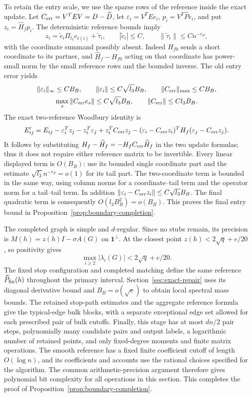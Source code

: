 To retain the entry scale, we use the sparse rows of the reference
inside the exact update.
Let $C_{\rm err}=V^TEV=D-\widehat D$, let
$\varepsilon_i=V^TEe_i$, $p_i=V^T\widehat Pe_i$, and put
$z_i=\widehat H_fp_i$.
The deterministic reference bounds imply
\[
 z_i=\widetilde c_i\Pi_{l_3}e_{t(i)}+\widetilde\tau_i,
 \qquad |\widetilde c_i|\le C,\qquad
 \|\widetilde\tau_i\|\le Cn^{-r_P},
\]
with the coordinate summand possibly absent.  Indeed
$H_{f0}$ sends a short coordinate to its partner, and
$\widehat H_f-H_{f0}$ acting on that coordinate has power-small
norm by the small reference rows and the bounded inverse.
The old entry error yields
\[
 \begin{gathered}
 \|\varepsilon_i\|_\infty\le CB_B,\qquad \|\varepsilon_i\|\le C\sqrt{l_3}B_B,\qquad
 \|C_{\rm err}\|_{\max}\le CB_B,\\
 \max_s\|C_{\rm err}e_s\|\le C\sqrt{l_3}B_B,\qquad
 \|C_{\rm err}\|\le Cl_3B_B.
 \end{gathered}
\]
The exact two-reference Woodbury identity is
\[
 E'_{ij}=E_{ij}-\varepsilon_i^Tz_j-z_i^T\varepsilon_j+z_i^TC_{\rm err}z_j
          -(\varepsilon_i-C_{\rm err}z_i)^TH_f(\varepsilon_j-C_{\rm err}z_j).
\]
It follows by substituting
$H_f-\widehat H_f=-H_fC_{\rm err}\widehat H_f$ in the two update
formulas; thus it does not require either reference matrix to be
invertible.
Every linear displayed term is $O(B_B)$: use its bounded single
coordinate part and the estimate
$\sqrt{l_3}n^{-r_P}=o(1)$ for its tail part.
The two-coordinate term is bounded in the same way, using column
norms for a coordinate--tail term and the operator norm for a
tail--tail term.  In addition
$\|\varepsilon_i-C_{\rm err}z_i\|\le C\sqrt{l_3}B_B$.
The final quadratic term is consequently $O(l_3B_B^2)=o(B_B)$.
This proves the final entry bound in
Proposition~\ref{prop:boundary-completion}.

The completed graph is simple and $d$-regular.  Since no stubs
remain, its precision is
$M(h)=z(h)I-\sigma A(G)$ on $\mathbf1^\perp$.
At the closest point $z(h)<2\sqrt q+e/20$, so positivity gives
\[
 \max_{i\ge2}|\lambda_i(G)|<2\sqrt q+e/20.
\]
The fixed stop configuration and completed matching define the same
reference $\widehat P_{\rm fin}(h)$ throughout the primary interval.
Section~\ref{sec:exact-repair} uses its diagonal derivative bound and
$B_B=o(\sqrt e)$ to obtain local spectral mass bounds.  The retained
stop-path estimates and the aggregate reference formula give the
typical-edge bulk blocks, with a separate exceptional edge set allowed
for each prescribed pair of bulk cutoffs.
Finally, this stage has at most $dn/2$ pair steps, polynomially
many candidate pairs and output labels, a logarithmic number of
retained points, and only fixed-degree moments and finite matrix
operations.  The smooth reference has a fixed finite coefficient
cutoff of length $O(\log n)$, and its coefficients and accounts use
the rational choices specified for the algorithm.  The common
arithmetic-precision argument therefore gives polynomial bit
complexity for all operations in this section.  This completes
the proof of Proposition~\ref{prop:boundary-completion}.

